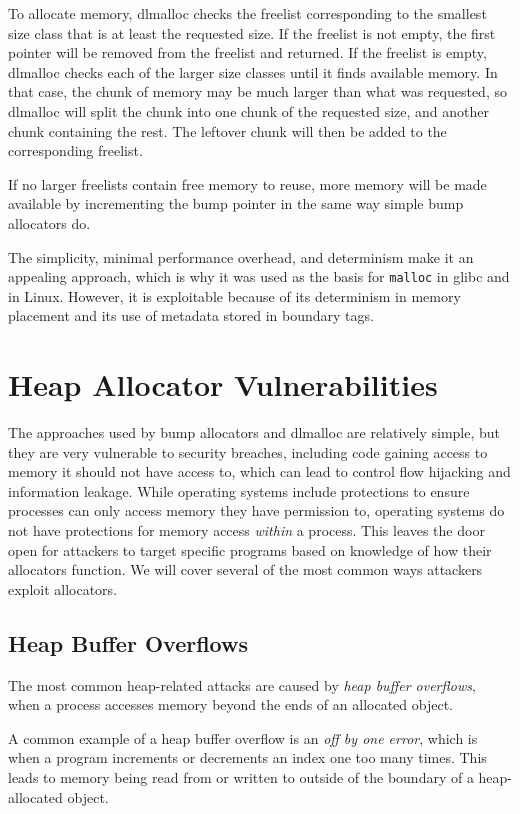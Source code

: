 \documentclass[conference]{IEEEtran}
\begin{document}
To allocate memory, dlmalloc checks the freelist corresponding to the smallest size class that is at least the requested size.
If the freelist is not empty, the first pointer will be removed from the freelist and returned.
If the freelist is empty, dlmalloc checks each of the larger size classes until it finds available memory.
In that case, the chunk of memory may be much larger than what was requested, so dlmalloc will split the chunk into one chunk of the requested size, and another chunk containing the rest.
The leftover chunk will then be added to the corresponding freelist.

If no larger freelists contain free memory to reuse, more memory will be made available by incrementing the bump pointer in the same way simple bump allocators do.

The simplicity, minimal performance overhead, and determinism make it an appealing approach, which is why it was used as the basis for \verb|malloc| in glibc and in Linux.
However, it is exploitable because of its determinism in memory placement and its use of metadata stored in boundary tags.

\section{Heap Allocator Vulnerabilities}

The approaches used by bump allocators and dlmalloc are relatively simple, but they are very vulnerable to security breaches, including code gaining access to memory it should not have access to, which can lead to control flow hijacking and information leakage.
While operating systems include protections to ensure processes can only access memory they have permission to, operating systems do not have protections for memory access \emph{within} a process.
This leaves the door open for attackers to target specific programs based on knowledge of how their allocators function.
We will cover several of the most common ways attackers exploit allocators.

\subsection{Heap Buffer Overflows}
The most common heap-related attacks are caused by \emph{heap buffer overflows}, when a process accesses memory beyond the ends of an allocated object.

A common example of a heap buffer overflow is an \emph{off by one error}, which is when a program increments or decrements an index one too many times.
This leads to memory being read from or written to outside of the boundary of a heap-allocated object.
\end{document}
